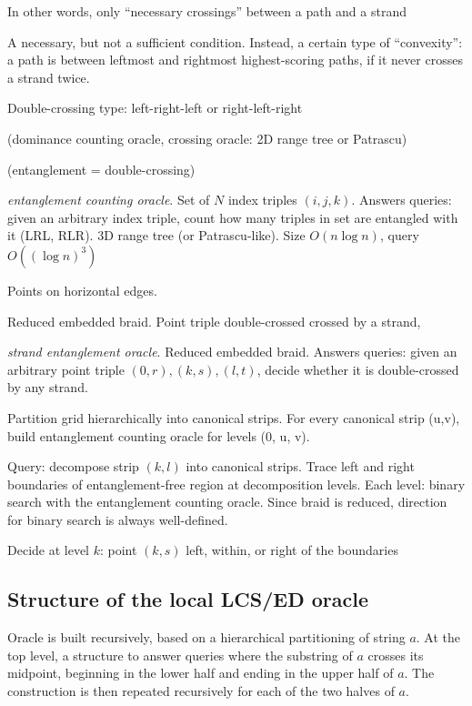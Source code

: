 \documentclass[a4paper,UKenglish,cleveref]{lipics-v2021}
\begin{document}
In other words, only ``necessary crossings'' between a path and a strand

A necessary, but not a sufficient condition.
Instead, a certain type of ``convexity'': 
a path is between leftmost and rightmost highest-scoring paths, if it never crosses a strand twice.

Double-crossing type: left-right-left or right-left-right

(dominance counting oracle, crossing oracle: 2D range tree or Patrascu)

(entanglement = double-crossing)

\emph{entanglement counting oracle}.
Set of $N$ index triples $(i, j, k)$.
Answers queries: given an arbitrary index triple, 
count how many triples in set are entangled with it (LRL, RLR).
3D range tree (or Patrascu-like).
Size $O(n \log n)$, query $O((\log n)^3)$

Points on horizontal edges.

Reduced embedded braid.
Point triple double-crossed crossed by a strand, 

\emph{strand entanglement oracle}.
Reduced embedded braid.
Answers queries: given an arbitrary point triple $(0,r), (k,s), (l,t)$,
decide whether it is double-crossed by any strand.

Partition grid hierarchically into canonical strips.
For every canonical strip (u,v), build entanglement counting oracle for levels (0, u, v).

Query: decompose strip $(k,l)$ into canonical strips.
Trace left and right boundaries of entanglement-free region at decomposition levels.
Each level: binary search with the entanglement counting oracle.
Since braid is reduced, direction for binary search is always well-defined.

Decide at level $k$: point $(k,s)$ left, within, or right of the boundaries

\subsection{Structure of the local LCS/ED oracle}

Oracle is built recursively, based on a hierarchical partitioning of string $a$.
At the top level, a structure to answer queries where the substring of $a$ crosses its midpoint,
beginning in the lower half and ending in the upper half of $a$.
The construction is then repeated recursively for each of the two halves of $a$.
\end{document}
